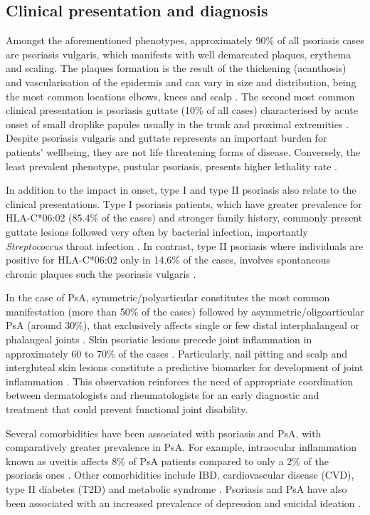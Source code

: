 \subsection{Clinical presentation and diagnosis}
%
Amongst the aforementioned phenotypes, approximately 90\% of all psoriasis cases are psoriasis vulgaris, which manifests with well demarcated plaques, erythema and scaling. The plaques formation is the result of the thickening (acanthosis) and vascularisation of the epidermis and can vary in size and distribution, being the most common locations elbows, knees and scalp \parencite{ Perera2012,Griffiths2007}. The second most common clinical presentation is psoriasis guttate (10\% of all cases) characterised by acute onset of small droplike papules usually in the trunk and proximal extremities \parencite{Vence2015}. Despite psoriasis vulgaris and guttate represents an important burden for patients’ wellbeing, they are not life threatening forms of disease. Conversely, the least prevalent phenotype, pustular psoriasis, presents higher lethality rate \parencite{Moura2015}.  

In addition to the impact in onset, type I and type II psoriasis also relate to the clinical presentations. Type I psoriasis patients, which have greater prevalence for HLA-C*06:02 (85.4\% of the cases) and stronger family history, commonly present guttate lesions followed very often by bacterial infection, importantly \textit{Streptococcus} throat infection \parencite{}. In contrast, type II psoriasis where individuals are positive for HLA-C*06:02 only in 14.6\% of the cases, involves spontaneous chronic plaques such the psoriasis vulgaris \parencite{Perera2012}. 

In the case of PsA, symmetric/polyarticular constitutes the most common manifestation (more than 50\% of the cases) followed by asymmetric/oligoarticular PsA (around 30\%), that exclusively affects single or few distal interphalangeal or phalangeal joints \parencite{Reich2009, McGonagle2011}. Skin psoriatic lesions precede joint inflammation in approximately 60 to 70\% of the cases \parencite{Gladman2005, McGonagle2011}. Particularly, nail pitting and scalp and intergluteal skin lesions constitute a predictive biomarker for development of joint inflammation \parencite{Moll1976,Griffiths2007,McGonagle,2011}. This observation reinforces the need of appropriate coordination between dermatologists and rheumatologists for an early diagnostic and treatment that could prevent functional joint disability.

Several comorbidities have been associated with psoriasis and PsA, with comparatively greater prevalence in PsA. For example, intraocular inflammation known as uveitis affects 8\% of PsA patients compared to only a 2\% of the psoriasis ones \parencite{Husted2011, Oliveira2015}. Other comorbidities include IBD, cardiovascular disease (CVD), type II diabetes (T2D) and metabolic syndrome \parencite{ Gelfand2006, Saphiro2007,Cohrn20017}. Psoriasis and PsA have also been associated with an increased prevalence of depression and suicidal ideation \parencite{Sampogna2012}.


